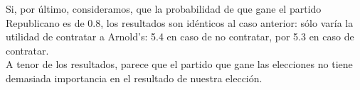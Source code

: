 \documentclass[12pt,a4paper,openright,final]{article}
\begin{document}
Si, por último, consideramos, que la probabilidad de que gane el partido Republicano es de 0.8, los resultados son idénticos al caso anterior: sólo varía la utilidad de contratar a Arnold's: 5.4 en caso de no contratar, por 5.3 en caso de contratar.\\

A tenor de los resultados, parece que el partido que gane las elecciones no tiene demasiada importancia en el resultado de nuestra elección.
\end{document}
